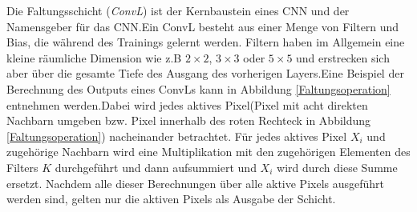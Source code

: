\documentclass[12pt,a4paper]{scrartcl}
\numberwithin{equation}{section}
\begin{document}
Die Faltungsschicht (\textit{\ac{ConvL}}) ist der Kernbaustein eines \ac{CNN} und der Namensgeber für das \ac{CNN}.Ein \ac{ConvL} besteht aus einer Menge von Filtern und Bias, die während des Trainings gelernt werden. Filtern haben im Allgemein eine kleine räumliche Dimension wie z.B $ 2\times 2 $, $3 \times3 $  oder  $5 \times 5$ und erstrecken sich aber über die gesamte Tiefe des Ausgang des vorherigen Layers.Eine Beispiel der Berechnung des Outputs eines \ac{ConvL}s kann in Abbildung \ref{Faltungsoperation} entnehmen werden.Dabei wird jedes aktives Pixel(Pixel mit acht direkten Nachbarn umgeben bzw. Pixel innerhalb des roten Rechteck in Abbildung \ref{Faltungsoperation}) nacheinander betrachtet. Für jedes aktives Pixel $ X_i $ und zugehörige Nachbarn wird eine Multiplikation mit den zugehörigen Elementen des Filters $ K $ durchgeführt und dann aufsummiert und $ X_i $ wird durch diese Summe ersetzt. Nachdem alle dieser Berechnungen über alle aktive Pixels ausgeführt werden sind, gelten nur die aktiven Pixels als Ausgabe der Schicht.
\end{document}
